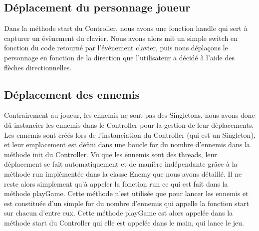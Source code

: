 \documentclass [10pt, a4paper]{article}
\begin{document}
\subsection {Déplacement du personnage joueur}
Dans la méthode start du Controller, nous avons une fonction handle qui sert à capturer un évènement du clavier. Nous avons alors mit un simple switch en fonction du code retourné par l'évènement clavier, puis nous déplaçons le personnage en fonction de la direction que l'utilisateur a décidé à l'aide des flèches directionnelles.

\subsection {Déplacement des ennemis}
Contrairement au joueur, les ennemis ne sont pas des Singletons, nous avons donc dû instancier les ennemis dans le Controller pour la gestion de leur déplacements. Les ennemis sont créés lors de l'instanciation du Controller (qui est un Singleton), et leur emplacement est défini dans une boucle for du nombre d'ennemis dans la méthode init du Controller. Vu que les ennemis sont des threads, leur déplacement se fait automatiquement et de manière indépendante grâce à la méthode run implémentée dans la classe Enemy que nous avons détaillé. Il ne reste alors simplement qu'à appeler la fonction run ce qui est fait dans la méthode playGame. Cette méthode n'est utilisée que pour lancer les ennemis et est constituée d'un simple for du nombre d'ennemis qui appelle la fonction start sur chacun d'entre eux. Cette méthode playGame est alors appelée dans la méthode start du Controller qui elle est appelée dans le main, qui lance le jeu.







\end{document}
